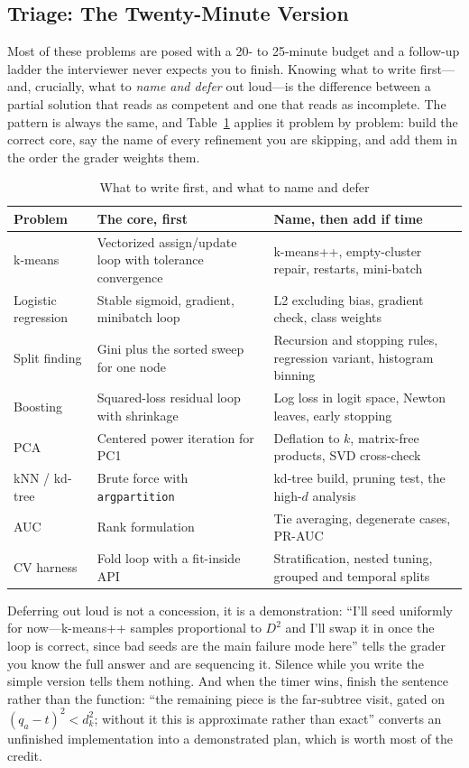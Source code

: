 \subsection{Triage: The Twenty-Minute Version}

Most of these problems are posed with a 20- to 25-minute budget and a follow-up ladder the interviewer never expects you to finish. Knowing what to write first---and, crucially, what to \emph{name and defer} out loud---is the difference between a partial solution that reads as competent and one that reads as incomplete. The pattern is always the same, and Table~\ref{cml:tab:canon_triage} applies it problem by problem: build the correct core, say the name of every refinement you are skipping, and add them in the order the grader weights them.

\begin{table}[H]\centering
\caption{What to write first, and what to name and defer}
\label{cml:tab:canon_triage}
\small
\begin{tabular}{p{2.6cm}p{5.4cm}p{5.6cm}}
\toprule
\textbf{Problem} & \textbf{The core, first} & \textbf{Name, then add if time} \\
\midrule
k-means & Vectorized assign/update loop with tolerance convergence & k-means++, empty-cluster repair, restarts, mini-batch \\
Logistic regression & Stable sigmoid, gradient, minibatch loop & L2 excluding bias, gradient check, class weights \\
Split finding & Gini plus the sorted sweep for one node & Recursion and stopping rules, regression variant, histogram binning \\
Boosting & Squared-loss residual loop with shrinkage & Log loss in logit space, Newton leaves, early stopping \\
PCA & Centered power iteration for PC1 & Deflation to $k$, matrix-free products, SVD cross-check \\
kNN / kd-tree & Brute force with \texttt{argpartition} & kd-tree build, pruning test, the high-$d$ analysis \\
AUC & Rank formulation & Tie averaging, degenerate cases, PR-AUC \\
CV harness & Fold loop with a fit-inside API & Stratification, nested tuning, grouped and temporal splits \\
\bottomrule
\end{tabular}
\end{table}

Deferring out loud is not a concession, it is a demonstration: ``I'll seed uniformly for now---k-means++ samples proportional to $D^2$ and I'll swap it in once the loop is correct, since bad seeds are the main failure mode here'' tells the grader you know the full answer and are sequencing it. Silence while you write the simple version tells them nothing. And when the timer wins, finish the sentence rather than the function: ``the remaining piece is the far-subtree visit, gated on $(q_a - t)^2 < d_k^2$; without it this is approximate rather than exact'' converts an unfinished implementation into a demonstrated plan, which is worth most of the credit.

